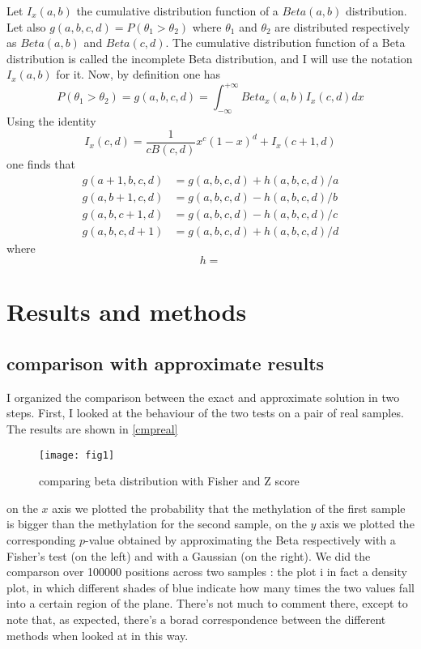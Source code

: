 \documentclass[11pt]{amsart}
\begin{document}
Let $I_x(a,b)$ the cumulative distribution function of a $Beta(a,b)$ distribution. Let also $g(a,b,c,d)=P(\theta_1>\theta_2)$ where $\theta_1$ and $\theta_2$ are distributed respectively as $Beta(a,b)$ and $Beta(c,d)$. The cumulative distribution function of a Beta distribution is called the incomplete Beta distribution, and I will use the notation $I_x(a,b)$ for it. Now, by definition one has \[P(\theta_1>\theta_2)=g(a,b,c,d)=\int_{-\infty}^{+\infty} Beta_x(a,b)I_x(c,d) dx\]
Using the identity \[I_x(c,d)=\frac{1}{cB(c,d)}x^c(1-x)^d+I_x(c+1,d)\] one finds that 
\begin{align}
g(a+1,b,c,d) &= g(a,b,c,d) + h(a,b,c,d)/a \\
g(a,b+1,c,d) &= g(a,b,c,d) - h(a,b,c,d)/b \\
g(a,b,c+1,d) &= g(a,b,c,d) - h(a,b,c,d)/c \\
g(a,b,c,d+1) &= g(a,b,c,d) + h(a,b,c,d)/d 
\end{align}
where \[h=\]
\section{Results and methods} 
\subsection{comparison with approximate results}
I organized the comparison between the exact and approximate solution in two steps. First,
I looked at the behaviour of the two tests on a pair of real samples. The results are shown in \ref{cmpreal}
\begin{figure}[h]
\caption{comparing beta distribution with Fisher and Z score}
\texttt{[image: fig1]}
\end{figure}\label{cmpreal}
on the $x$ axis we plotted the probability that the methylation of the first sample is bigger than the methylation for the second sample, on the $y$ axis we plotted the corresponding $p$-value obtained by approximating the Beta respectively with a Fisher's test (on the left) and with a Gaussian (on the right).
We did the comparson over 100000 positions across two samples : the plot i in fact a density plot, in which different shades of blue indicate how many times the two values fall into a certain region of the plane. There's not much to comment there, except to note that, as expected, there's a borad correspondence between the different methods when looked at in this way.
\end{document}
